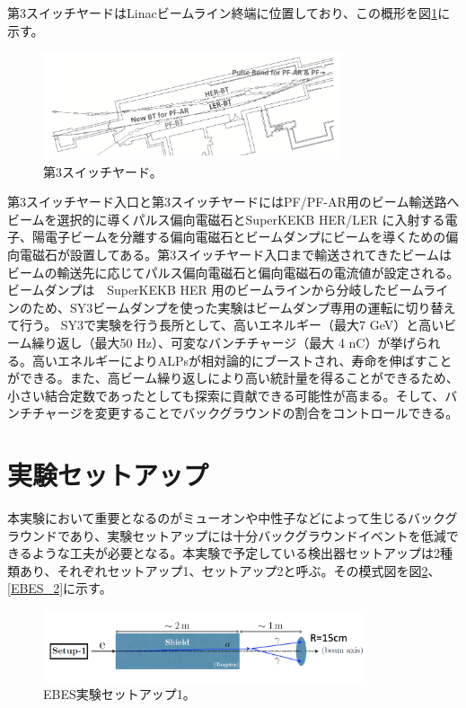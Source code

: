 第3スイッチヤードはLinacビームライン終端に位置しており、この概形を図\ref{SY3}に示す。
\begin{figure}[H]
	\begin{center}
		\includegraphics[width=250pt]{./Figure/EBES/SY3.png}
		\caption[第3スイッチヤード]{第3スイッチヤード。}
		\label{SY3}
	\end{center}
\end{figure}

第3スイッチヤード入口と第3スイッチヤードにはPF/PF-AR用のビーム輸送路へビームを選択的に導くパルス偏向電磁石とSuperKEKB HER/LER に入射する電子、陽電子ビームを分離する偏向電磁石とビームダンプにビームを導くための偏向電磁石が設置してある。第3スイッチヤード入口まで輸送されてきたビームはビームの輸送先に応じてパルス偏向電磁石と偏向電磁石の電流値が設定される。ビームダンプは　SuperKEKB HER 用のビームラインから分岐したビームラインのため、SY3ビームダンプを使った実験はビームダンプ専用の運転に切り替えて行う。
SY3で実験を行う長所として、高いエネルギー（最大7 GeV）と高いビーム繰り返し（最大50 Hz）、可変なバンチチャージ（最大 4 nC）が挙げられる。高いエネルギーによりALPsが相対論的にブーストされ、寿命を伸ばすことができる。また、高ビーム繰り返しにより高い統計量を得ることができるため、小さい結合定数であったとしても探索に貢献できる可能性が高まる。そして、バンチチャージを変更することでバックグラウンドの割合をコントロールできる。

\section{実験セットアップ}
本実験において重要となるのがミューオンや中性子などによって生じるバックグラウンドであり、実験セットアップには十分バックグラウンドイベントを低減できるような工夫が必要となる。本実験で予定している検出器セットアップは2種類あり、それぞれセットアップ1、セットアップ2と呼ぶ。その模式図を図\ref{EBES_1}、\ref{EBES_2}に示す。
\begin{figure}[H]
	\begin{center}
		\includegraphics[width=270pt]{./Figure/EBES/EBES_1.png}
		\caption[EBES実験セットアップ1]{EBES実験セットアップ1。}
		\label{EBES_1}
	\end{center}
\end{figure}

